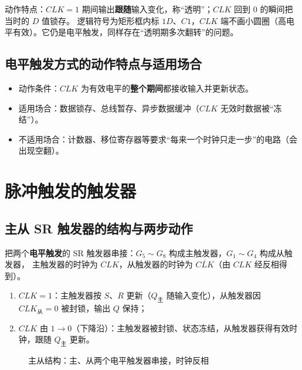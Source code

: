 \noindent 动作特点：$CLK=1$ 期间输出\textbf{跟随}输入变化，称“透明”；$CLK$ 回到 0 的瞬间把当时的 $D$ 值锁存。
逻辑符号为矩形框内标 $1D$、$C1$，$CLK$ 端不画小圆圈（高电平有效）。它仍是电平触发，同样存在“透明期多次翻转”的问题。

\subsection{电平触发方式的动作特点与适用场合}
\begin{itemize}
    \item 动作条件：$CLK$ 为有效电平的\textbf{整个期间}都接收输入并更新状态。
    \item 适用场合：数据锁存、总线暂存、异步数据缓冲（$CLK$ 无效时数据被“冻结”）。
    \item 不适用场合：计数器、移位寄存器等要求“每来一个时钟只走一步”的电路（会出现空翻）。
\end{itemize}

\section{脉冲触发的触发器}
\subsection{主从 SR 触发器的结构与两步动作}
把两个\textbf{电平触发}的 SR 触发器串接：$G_5\sim G_8$ 构成主触发器，$G_1\sim G_4$ 构成从触发器，
主触发器的时钟为 $CLK$，从触发器的时钟为 $\overline{CLK}$（由 $CLK$ 经反相得到）。

\begin{enumerate}
    \item $CLK=1$：主触发器按 $S$、$R$ 更新（$Q_{\text{主}}$ 随输入变化），从触发器因 $CLK_{\text{从}}=0$ 被封锁，输出 $Q$ 保持；
    \item $CLK$ 由 $1\rightarrow 0$（下降沿）：主触发器被封锁、状态冻结，从触发器获得有效时钟，跟随 $Q_{\text{主}}$ 更新。
\end{enumerate}

\begin{figure}[!htbp]
\centering
{}
\caption{主从结构：主、从两个电平触发器串接，时钟反相}
\label{fig:master_slave}
\end{figure}

